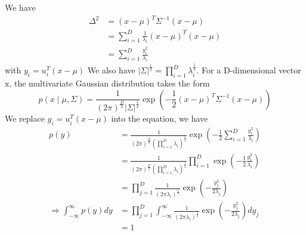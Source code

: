 \documentclass[a4paper, 10pt]{article}  %
\begin{document}
\begin{enumerate}[label=\textbf{(\alph*)}]
We have
$$
\begin{aligned}
\Delta^{2} &=(x-\mu)^{T} \Sigma^{-1}(x-\mu) \\
&=\sum_{i=1}^{D} \frac{1}{\lambda_{i}}(x-\mu)^{T}(x-\mu) \\
&=\sum_{i=1}^{D} \frac{y_{i}^{2}}{\lambda_{i}}
\end{aligned}
$$
with $y_{i}=u_{i}^{T}(x-\mu)$ We also have $|\Sigma|^{\frac{1}{2}}=\prod_{i=1}^{D} \lambda_{i}^{\frac{1}{2}}$.
For a D-dimensional vector $\mathrm{x}$, the multivariate Gaussian distribution takes the form
\[p(x \mid \mu, \Sigma)=\frac{1}{(2 \pi)^{\frac{D}{2}}|\Sigma|^{\frac{1}{2}}} \exp \left(-\frac{1}{2}(x-\mu)^{T} \Sigma^{-1}(x-\mu)\right)\]
We replace $y_{i}=u_{i}^{T}(x-\mu)$ into the equation, we have
$$
\begin{aligned}
p(y) &=\frac{1}{(2 \pi)^{\frac{D}{2}}\left(\prod_{i=1}^{D} \lambda_{i}\right)^{\frac{1}{2}}} \exp \left(-\frac{1}{2} \sum_{i=1}^{D} \frac{y_{i}^{2}}{\lambda_{i}}\right) \\
&=\frac{1}{(2 \pi)^{\frac{D}{2}}\left(\prod_{i=1}^{D} \lambda_{i}\right)^{\frac{1}{2}}} \prod_{i=1}^{D} \exp \left(-\frac{1}{2} \frac{y_{i}^{2}}{\lambda_{i}}\right) \\
&=\prod_{j=1}^{D} \frac{1}{\left(2 \pi \lambda_{i}\right)^{\frac{1}{2}}} \exp \left(-\frac{y_{j}^{2}}{2 \lambda_{j}}\right) \\
\Longrightarrow \int_{-\infty}^{\infty} p(y) d y &=\prod_{j=1}^{D} \int_{-\infty}^{\infty} \frac{1}{\left(2 \pi \lambda_{i}\right)^{\frac{1}{2}}} \exp \left(-\frac{y_{j}^{2}}{2 \lambda_{j}}\right) d y_{j} \\
&=1
\end{aligned}
$$
\end{enumerate}

\end{document}
